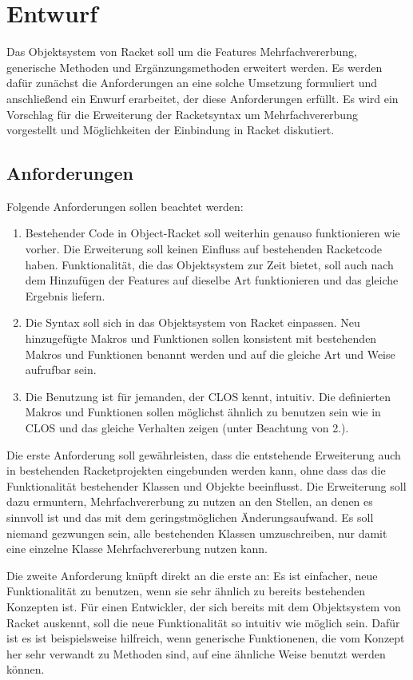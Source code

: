 \chapter{Entwurf} 
Das Objektsystem von Racket soll um die Features Mehrfachvererbung, generische Methoden und Ergänzungsmethoden erweitert werden. Es werden dafür zunächst die Anforderungen an eine solche Umsetzung formuliert und anschließend ein Enwurf erarbeitet, der diese Anforderungen erfüllt. Es wird ein Vorschlag für die Erweiterung der Racketsyntax um Mehrfachvererbung vorgestellt und Möglichkeiten der Einbindung in Racket diskutiert.

\section{Anforderungen}
Folgende Anforderungen sollen beachtet werden:
\begin{enumerate}
 \item Bestehender Code in Object-Racket soll weiterhin genauso funktionieren wie vorher. Die Erweiterung soll keinen Einfluss auf bestehenden Racketcode haben. Funktionalität, die das Objektsystem zur Zeit bietet, soll auch nach dem Hinzufügen der Features auf dieselbe Art funktionieren und das gleiche Ergebnis liefern.
 \item Die Syntax soll sich in das Objektsystem von Racket einpassen. Neu hinzugefügte Makros und Funktionen sollen konsistent mit bestehenden Makros und Funktionen benannt werden und auf die gleiche Art und Weise aufrufbar sein. 
 \item Die Benutzung ist für jemanden, der CLOS kennt, intuitiv. Die definierten Makros und Funktionen sollen möglichst ähnlich zu benutzen sein wie in CLOS und das gleiche Verhalten zeigen (unter Beachtung von 2.).
\end{enumerate}

Die erste Anforderung soll gewährleisten, dass die entstehende Erweiterung auch in bestehenden Racketprojekten eingebunden werden kann, ohne dass das die Funktionalität bestehender Klassen und Objekte beeinflusst. Die Erweiterung soll dazu ermuntern, Mehrfachvererbung zu nutzen an den Stellen, an denen es sinnvoll ist und das mit dem geringstmöglichen Änderungsaufwand. Es soll niemand gezwungen sein, alle bestehenden Klassen umzuschreiben, nur damit eine einzelne Klasse Mehrfachvererbung nutzen kann.

Die zweite Anforderung knüpft direkt an die erste an: Es ist einfacher, neue Funktionalität zu benutzen, wenn sie sehr ähnlich zu bereits bestehenden Konzepten ist. Für einen Entwickler, der sich bereits mit dem Objektsystem von Racket auskennt, soll die neue Funktionalität so intuitiv wie möglich sein. Dafür ist es ist beispielsweise hilfreich, wenn generische Funktionenen, die vom Konzept her sehr verwandt zu Methoden sind, auf eine ähnliche Weise benutzt werden können.

